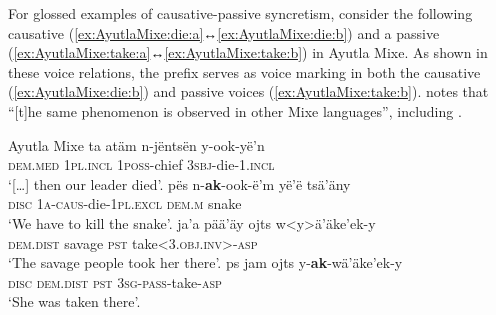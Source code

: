 \newpage

For glossed examples of causative-passive syncretism, consider the following causative  (\ref{ex:AyutlaMixe:die:a}↔\ref{ex:AyutlaMixe:die:b}) and a passive  (\ref{ex:AyutlaMixe:take:a}↔\ref{ex:AyutlaMixe:take:b}) in Ayutla Mixe. As shown in these voice relations, the prefix  serves as voice marking in both the causative (\ref{ex:AyutlaMixe:die:b}) and passive voices (\ref{ex:AyutlaMixe:take:b}). \cite[370]{romero-mendez:2009} notes that “[t]he same phenomenon is observed in other Mixe languages”, including  \citep{zavala:2000}. 

\ea Ayutla Mixe \citep[482, 495]{romero-mendez:2009}
\ea\label{ex:AyutlaMixe:die:a}
	\gll	ta atäm n-jëntsën y-ook-yë’n \\
			\textsc{dem.med} \textsc{1pl.incl} \textsc{1poss}-chief \textsc{3sbj}-die-\textsc{1.incl} \\
	\glt	‘[…] then our leader died’.
\ex\label{ex:AyutlaMixe:die:b}
	\gll	pës n-\textbf{ak}-ook-ë’m yë’ë tsä’äny \\
			\textsc{disc} \textsc{1a-caus}-die-\textsc{1pl.excl} \textsc{dem.m} snake \\
	\glt	‘We have to kill the snake’.
\ex\label{ex:AyutlaMixe:take:a}
	\gll	ja’a pää’äy ojts w<y>ä’äke’ek-y \\
			\textsc{dem.dist} savage \textsc{pst} take<\textsc{3.obj.inv}>-\textsc{asp} \\
	\glt	‘The savage people took her there’.
\ex\label{ex:AyutlaMixe:take:b}
	\gll	ps jam ojts y-\textbf{ak}-wä’äke’ek-y \\
			\textsc{disc} \textsc{dem.dist} \textsc{pst} \textsc{3sg-pass}-take-\textsc{asp} \\
	\glt	‘She was taken there’.
	\z 
\z

